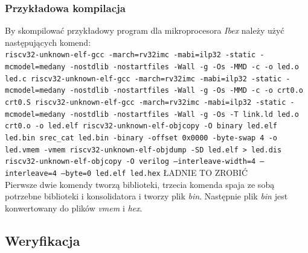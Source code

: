 \documentclass[11pt,a4paper]{article}
\def\code#1{\texttt{#1}}
\begin{document}
		\subsubsection{Przykładowa kompilacja}
		\hspace{5mm}
			By skompilować przykładowy program dla mikroprocesora 
			\textit{Ibex} należy użyć następujących komend: \\
\code{riscv32-unknown-elf-gcc -march=rv32imc -mabi=ilp32 -static -mcmodel=medany -nostdlib -nostartfiles -Wall -g -Os -MMD -c  -o led.o led.c
riscv32-unknown-elf-gcc -march=rv32imc -mabi=ilp32 -static -mcmodel=medany -nostdlib -nostartfiles -Wall -g -Os -MMD -c  -o crt0.o crt0.S
riscv32-unknown-elf-gcc -march=rv32imc -mabi=ilp32 -static -mcmodel=medany -nostdlib -nostartfiles -Wall -g -Os -T link.ld led.o crt0.o -o led.elf 
riscv32-unknown-elf-objcopy -O binary led.elf led.bin
srec\_cat led.bin -binary -offset 0x0000 -byte-swap 4 -o led.vmem -vmem
riscv32-unknown-elf-objdump -SD led.elf > led.dis
riscv32-unknown-elf-objcopy -O verilog --interleave-width=4 --interleave=4 --byte=0 led.elf led.hex} ŁADNIE TO ZROBIĆ\\
Pierwsze dwie komendy tworzą biblioteki, trzecia komenda spaja ze sobą potrzebne biblioteki i konsolidatora i tworzy plik \textit{bin}. Następnie plik \textit{bin} jest konwertowany do plików \textit{vmem} i \textit{hex}.
	\subsection{Weryfikacja}
\end{document}
